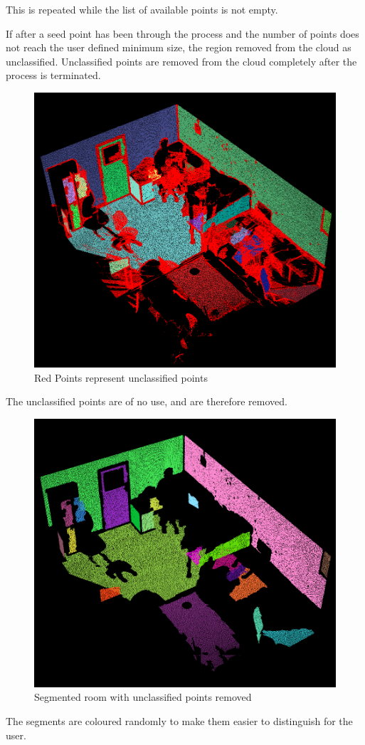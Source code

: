 		This is repeated while the list of available points is not empty.
		
		If after a seed point has been through the process and the number of points does not reach the user defined minimum size, the region removed from the cloud as unclassified. Unclassified points are removed from the cloud completely after the process is terminated.
		
		\begin{figure}[H]
			\centering
			\includegraphics[width=0.6\linewidth]{Includes/images/GrownRegions}
			\caption{Red Points represent unclassified points}
			\label{fig:GrownRegions}
		\end{figure}
		
		The unclassified points are of no use, and are therefore removed.
		
		
		\begin{figure}[H]
			\centering
			\includegraphics[width=0.6\linewidth]{Includes/images/RG-noUnclass}
			\caption{Segmented room with unclassified points removed}
			\label{fig:RG-noUnclass}
		\end{figure}
		
		The segments are coloured randomly to make them easier to distinguish for the user.
		
